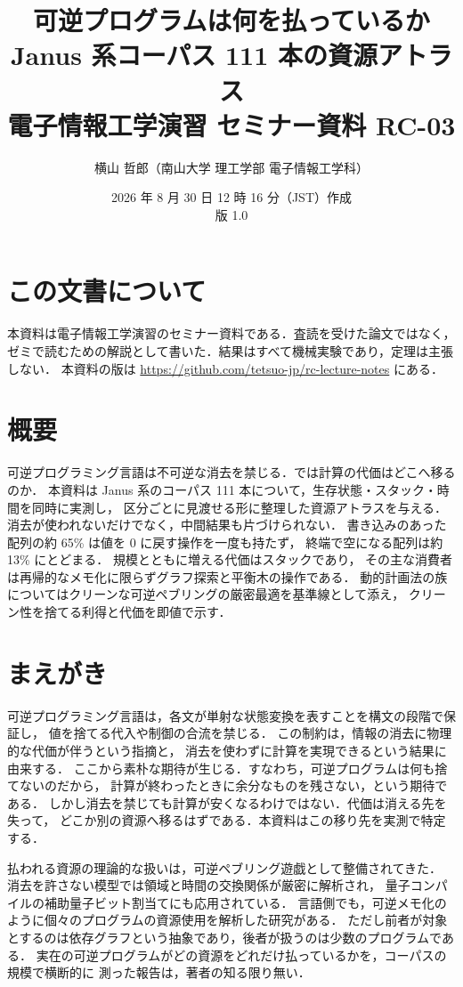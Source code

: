 \documentclass[a4paper,11pt]{jsarticle}
\title{可逆プログラムは何を払っているか\\
\large Janus 系コーパス 111 本の資源アトラス\\
\large 電子情報工学演習 セミナー資料 RC-03}
\author{横山 哲郎（南山大学 理工学部 電子情報工学科）}
\date{2026 年 8 月 30 日 12 時 16 分（JST）作成\\版 1.0}
\begin{document}
\maketitle

\section*{この文書について}
本資料は電子情報工学演習のセミナー資料である．査読を受けた論文ではなく，
ゼミで読むための解説として書いた．結果はすべて機械実験であり，定理は主張しない．
本資料の版は \url{https://github.com/tetsuo-jp/rc-lecture-notes} にある．

\section*{概要}
可逆プログラミング言語は不可逆な消去を禁じる．では計算の代価はどこへ移るのか．
本資料は Janus 系のコーパス 111 本について，生存状態・スタック・時間を同時に実測し，
区分ごとに見渡せる形に整理した資源アトラスを与える．
消去が使われないだけでなく，中間結果も片づけられない．
書き込みのあった配列の約 65\% は値を 0 に戻す操作を一度も持たず，
終端で空になる配列は約 13\% にとどまる．
規模とともに増える代価はスタックであり，
その主な消費者は再帰的なメモ化に限らずグラフ探索と平衡木の操作である．
動的計画法の族についてはクリーンな可逆ペブリングの厳密最適を基準線として添え，
クリーン性を捨てる利得と代価を即値で示す．

\section{まえがき}\label{sec:intro}

可逆プログラミング言語は，各文が単射な状態変換を表すことを構文の段階で保証し，
値を捨てる代入や制御の合流を禁じる\cite{LRR82:janus,GlYo23:perspective}．
この制約は，情報の消去に物理的な代価が伴うという指摘\cite{Land91}と，
消去を使わずに計算を実現できるという結果\cite{Benn73}に由来する．
ここから素朴な期待が生じる．すなわち，可逆プログラムは何も捨てないのだから，
計算が終わったときに余分なものを残さない，という期待である．
しかし消去を禁じても計算が安くなるわけではない．代価は消える先を失って，
どこか別の資源へ移るはずである．本資料はこの移り先を実測で特定する．

払われる資源の理論的な扱いは，可逆ペブリング遊戯として整備されてきた．
消去を許さない模型では領域と時間の交換関係が厳密に解析され\cite{LiTV98}，
量子コンパイルの補助量子ビット割当てにも応用されている\cite{Meuli19:pebbling}．
言語側でも，可逆メモ化のように個々のプログラムの資源使用を解析した研究がある\cite{Yoko17}．
ただし前者が対象とするのは依存グラフという抽象であり，後者が扱うのは少数のプログラムである．
実在の可逆プログラムがどの資源をどれだけ払っているかを，コーパスの規模で横断的に
測った報告は，著者の知る限り無い．
\end{document}
